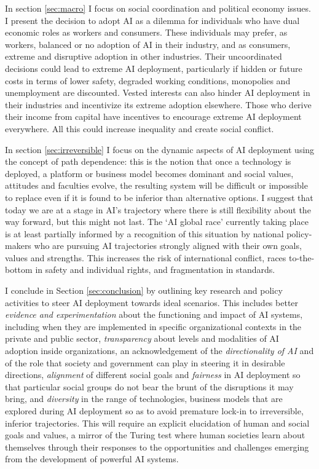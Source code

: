 \documentclass[11pt]{article}
\begin{document}
 In section \ref{sec:macro} I focus on social coordination and political economy issues. I present the decision to adopt AI as a dilemma for individuals who have dual economic roles as workers and consumers. These individuals may prefer, as workers,  balanced or no adoption of AI in their industry, and as consumers, extreme and disruptive adoption in other industries. Their uncoordinated decisions could lead to extreme AI deployment, particularly if hidden or future costs in terms of lower safety, degraded working conditions, monopolies and unemployment are discounted. Vested interests can also hinder AI deployment in their industries and incentivize its extreme adoption elsewhere. Those who derive their income from capital have incentives to encourage extreme AI deployment everywhere. All this could increase inequality and create social conflict.
  
 In section \ref{sec:irreversible} I focus on the dynamic aspects of AI deployment using the concept of path dependence: this is the notion that once a technology is deployed, a platform or business model becomes dominant and social values, attitudes and faculties evolve, the resulting system will be difficult or impossible to replace even if it is found to be inferior than alternative options. I suggest that today we are at a stage in AI's trajectory where there is still flexibility about the way forward, but this might not last. The `AI global race' currently taking place is at least partially informed by a recognition of this situation by national policy-makers who are pursuing AI trajectories strongly aligned with their own goals, values and strengths. This increases the risk of international conflict, races to-the-bottom in safety and individual rights, and fragmentation in standards.

I conclude in Section \ref{sec:conclusion} by outlining key research and policy activities to steer AI deployment towards ideal scenarios. This includes better \textit{evidence and experimentation} about the functioning and impact of AI systems, including when they are implemented in specific organizational contexts in the private and public sector, \textit{transparency} about levels and modalities of AI adoption inside organizations, an acknowledgement of the \textit{directionality of AI} and of the role that society and government can play in steering it in desirable directions, \textit{alignment} of different social goals and \textit{fairness} in AI deployment so that particular social groups do not bear the brunt of the disruptions it may bring, and \textit{diversity} in the range of technologies, business models that are explored during AI deployment so as to avoid premature lock-in to irreversible, inferior trajectories. This will require an explicit elucidation of human and social goals and values, a mirror of the Turing test where human societies learn about themselves through their responses to the opportunities and challenges emerging from the development of powerful AI systems. 
\end{document}
